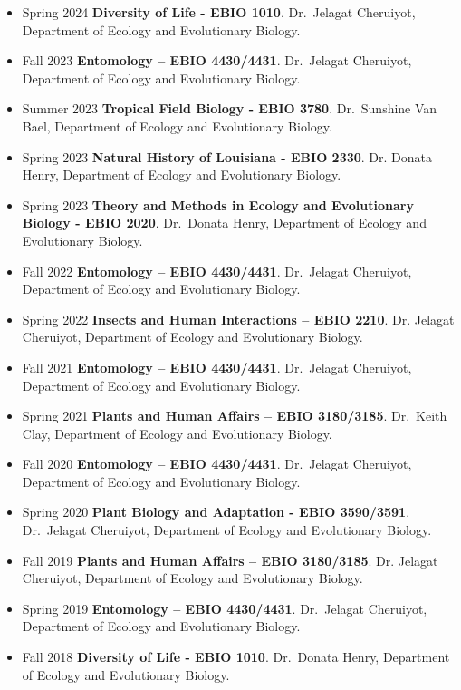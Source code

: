 \documentclass[
  letterpaper,
  DIV=11,
  numbers=noendperiod]{scrartcl}
\begin{document}
\begin{itemize}
\item
  Spring 2024 \textbar{} \textbf{Diversity of Life - EBIO 1010}.
  Dr.~Jelagat Cheruiyot, Department of Ecology and Evolutionary Biology.
\item
  Fall 2023 \textbar{} \textbf{Entomology -- EBIO 4430/4431}.
  Dr.~Jelagat Cheruiyot, Department of Ecology and Evolutionary Biology.
\item
  Summer 2023 \textbar{} \textbf{Tropical Field Biology - EBIO 3780}.
  Dr.~Sunshine Van Bael, Department of Ecology and Evolutionary Biology.
\item
  Spring 2023 \textbar{} \textbf{Natural History of Louisiana - EBIO
  2330}. Dr. Donata Henry, Department of Ecology and Evolutionary
  Biology.
\item
  Spring 2023 \textbar{} \textbf{Theory and Methods in Ecology and
  Evolutionary Biology - EBIO 2020}. Dr.~Donata Henry, Department of
  Ecology and Evolutionary Biology.
\item
  Fall 2022 \textbar{} \textbf{Entomology -- EBIO 4430/4431}.
  Dr.~Jelagat Cheruiyot, Department of Ecology and Evolutionary Biology.
\item
  Spring 2022 \textbar{} \textbf{Insects and Human Interactions -- EBIO
  2210}. Dr. Jelagat Cheruiyot, Department of Ecology and Evolutionary
  Biology.
\item
  Fall 2021 \textbar{} \textbf{Entomology -- EBIO 4430/4431}.
  Dr.~Jelagat Cheruiyot, Department of Ecology and Evolutionary Biology.
\item
  Spring 2021 \textbar{} \textbf{Plants and Human Affairs -- EBIO
  3180/3185}. Dr.~Keith Clay, Department of Ecology and Evolutionary
  Biology.
\item
  Fall 2020 \textbar{} \textbf{Entomology -- EBIO 4430/4431}.
  Dr.~Jelagat Cheruiyot, Department of Ecology and Evolutionary Biology.
\item
  Spring 2020 \textbar{} \textbf{Plant Biology and Adaptation - EBIO
  3590/3591}. Dr.~Jelagat Cheruiyot, Department of Ecology and
  Evolutionary Biology.
\item
  Fall 2019 \textbar{} \textbf{Plants and Human Affairs -- EBIO
  3180/3185}. Dr. Jelagat Cheruiyot, Department of Ecology and
  Evolutionary Biology.
\item
  Spring 2019 \textbar{} \textbf{Entomology -- EBIO 4430/4431}.
  Dr.~Jelagat Cheruiyot, Department of Ecology and Evolutionary Biology.
\item
  Fall 2018 \textbar{} \textbf{Diversity of Life - EBIO 1010}.
  Dr.~Donata Henry, Department of Ecology and Evolutionary Biology.
\end{itemize}
\end{document}
